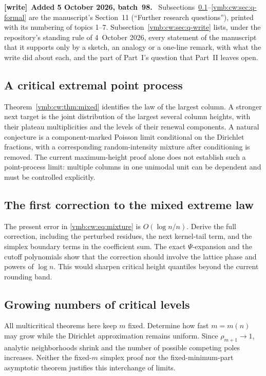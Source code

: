 \documentclass[11pt,a4paper]{article}
\numberwithin{equation}{section}
\theoremstyle{definition}\newtheorem{definition}[theorem]{Definition}
\theoremstyle{remark}\newtheorem{remark}[theorem]{Remark}
\newenvironment{writenote}[1][]{\par\smallskip\begingroup\small
 \noindent\textbf{[write]}\if\relax\detokenize{#1}\relax\else~\textbf{#1.}\fi\ }%
 {\par\endgroup\smallskip}
\begin{document}
\begin{writenote}[Added 5 October 2026, batch~98]
Subsections~\ref{vmb:cw:sec:q-pointprocess}--\ref{vmb:cw:sec:q-formal} are
the manuscript's Section~11 (``Further research questions''), printed with
its numbering of topics 1--7. Subsection~\ref{vmb:cw:sec:q-write} lists, under
the repository's standing rule of 4~October 2026, every statement of the
manuscript that it supports only by a sketch, an analogy or a one-line
remark, with what the write did about each, and the part of Part~I's question
that Part~II leaves open.
\end{writenote}

\subsection{A critical extremal point process}
\label{vmb:cw:sec:q-pointprocess}
Theorem~\ref{vmb:cw:thm:mixed} identifies the law of the largest column. A stronger
next target is the joint distribution of the largest several column heights,
with their plateau multiplicities and the levels of their renewal components.
A natural conjecture is a component-marked Poisson limit conditional on the
Dirichlet fractions, with a corresponding random-intensity mixture after
conditioning is removed. The current maximum-height proof alone does not
establish such a point-process limit: multiple columns in one unimodal unit
can be dependent and must be controlled explicitly.

\subsection{The first correction to the mixed extreme law}
The present error in \eqref{vmb:cw:eq:mixture} is $O(\log n/n)$. Derive the full
correction, including the perturbed residues, the next kernel-tail term,
and the simplex boundary terms in the coefficient sum. The exact
$\Psi$-expansion and the cutoff polynomials show that the correction should
involve the lattice phase and powers of $\log n$. This would sharpen
critical height quantiles beyond the current rounding band.

\subsection{Growing numbers of critical levels}
All multicritical theorems here keep $m$ fixed. Determine how fast $m=m(n)$
may grow while the Dirichlet approximation remains uniform. Since
$\rho_{m+1}\to1$, analytic neighborhoods shrink and the number of possible
competing poles increases. Neither the fixed-$m$ simplex proof nor the
fixed-minimum-part asymptotic theorem justifies this interchange of limits.
\end{document}

